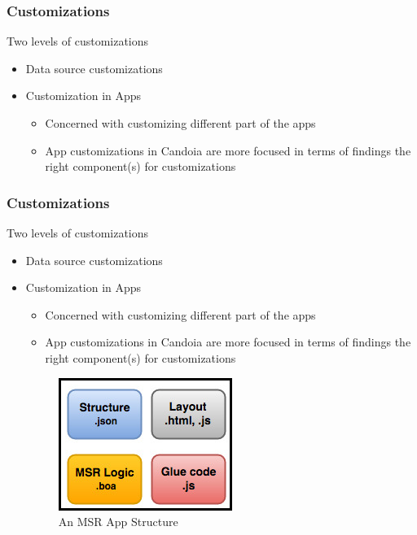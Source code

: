         \begin{frame}
        \frametitle{Customizations}
            Two levels of customizations
            \begin{itemize}
                \item Data source customizations
                \item Customization in Apps
                    \begin{itemize}
                        \item Concerned with customizing different part of the apps
                        \item App customizations in Candoia are more focused in terms of findings the right component(s) for customizations
                    \end{itemize}
            \end{itemize}
        \end{frame}

        \begin{frame}
        \frametitle{Customizations}
            Two levels of customizations
            \begin{itemize}
                \item Data source customizations
                \item Customization in Apps
                    \begin{itemize}
                        \item Concerned with customizing different part of the apps
                        \item App customizations in Candoia are more focused in terms of findings the right component(s) for customizations
                        \end{itemize}
            \begin{figure}
                \centering
                \includegraphics[scale=0.40]{figures/app.jpg}
                \caption{An MSR App Structure}
            \end{figure}
            \end{itemize}
        \end{frame}


